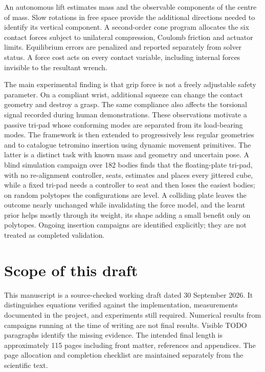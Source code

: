 An autonomous lift estimates mass and the observable components of the centre of mass. Slow rotations in free space provide the additional directions needed to identify its vertical component. A second-order cone program allocates the six contact forces subject to unilateral compression, Coulomb friction and actuator limits. Equilibrium errors are penalized and reported separately from solver status. A force cost acts on every contact variable, including internal forces invisible to the resultant wrench.

The main experimental finding is that grip force is not a freely adjustable safety parameter. On a compliant wrist, additional squeeze can change the contact geometry and destroy a grasp. The same compliance also affects the torsional signal recorded during human demonstrations. These observations motivate a passive tri-pad whose conforming modes are separated from its load-bearing modes. The framework is then extended to progressively less regular geometries and to catalogue tetromino insertion using dynamic movement primitives. The latter is a distinct task with known mass and geometry and uncertain pose. A blind simulation campaign over 182 bodies finds that the floating-plate tri-pad, with no re-alignment controller, seats, estimates and places every jittered cube, while a fixed tri-pad needs a controller to seat and then loses the easiest bodies; on random polytopes the configurations are level. A colliding plate leaves the outcome nearly unchanged while invalidating the force model, and the learnt prior helps mostly through its weight, its shape adding a small benefit only on polytopes. Ongoing insertion campaigns are identified explicitly; they are not treated as completed validation.

\chapter*{Scope of this draft}
This manuscript is a source-checked working draft dated 30 September 2026. It distinguishes equations verified against the implementation, measurements documented in the project, and experiments still required. Numerical results from campaigns running at the time of writing are not final results. Visible TODO paragraphs identify the missing evidence. The intended final length is approximately 115 pages including front matter, references and appendices. The page allocation and completion checklist are maintained separately from the scientific text.


